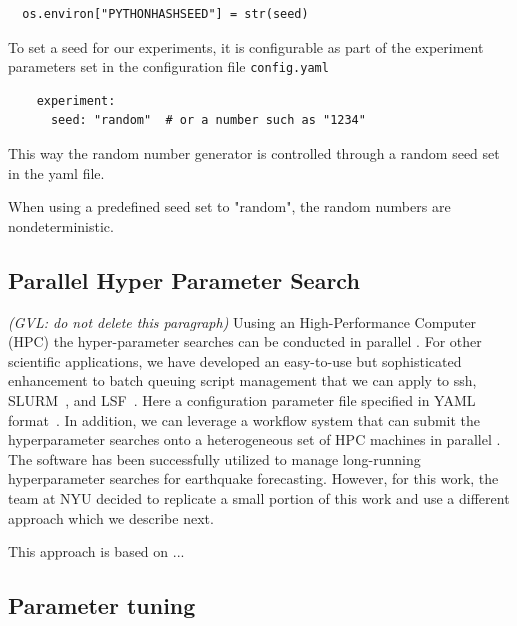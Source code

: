 \documentclass[sigplan,screen]{acmart}
\begin{document}
{\footnotesize
\begin{verbatim}
  os.environ["PYTHONHASHSEED"] = str(seed)
\end{verbatim}}


To set a seed for our experiments, it is configurable as part of the  experiment parameters set in the configuration file \verb|config.yaml|

{\footnotesize
\begin{verbatim}
    experiment:
      seed: "random"  # or a number such as "1234"
\end{verbatim}}

This way the  random number generator is controlled through a  random seed set in the yaml file.

When using a predefined seed set to "random", the random numbers are nondeterministic. 


\subsection{Parallel Hyper Parameter Search}

{\em (GVL: do not delete this paragraph)}
Uusing an High-Performance Computer (HPC) the hyper-parameter searches can be conducted in parallel \cite{github-cloudmesh-sbatch}. For other scientific applications, we have developed an easy-to-use but sophisticated enhancement to batch queuing script management that we can apply to ssh, SLURM~\cite{www-slurm}, and LSF~\cite{www-lsf}. Here a configuration parameter file specified in YAML format~\cite{github-cloudmesh-sbatch}. In addition, we can leverage a workflow system that can submit the hyperparameter searches onto a heterogeneous set of HPC machines in parallel \cite{github-cloudmesh-cc,las22-cloudmesh-cc-reu}. The software has been successfully utilized to manage long-running hyperparameter searches for earthquake forecasting.  However, for this work, the team at NYU decided to replicate a small portion of this work and use a different approach which we describe next. 

This approach is based on ... 


\subsection{Parameter tuning}
\end{document}
